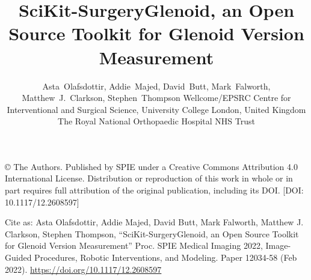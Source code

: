 \documentclass[a4paper, lmargin=1.925cm, rmargin=1.925cm,tmargin=2.54cm,bmargin=4.94cm]{spie}
\begin{document}
%
%
\pagestyle{plain}
%
%
\title{SciKit-SurgeryGlenoid, an Open Source Toolkit for Glenoid Version Measurement}
%
\author{Asta~Olafsdottir, Addie~Majed, David~Butt, Mark~Falworth,
Matthew~J.~Clarkson,
Stephen~Thompson
\skiplinehalf
{}Wellcome/EPSRC Centre for Interventional and Surgical Science, University College London, United Kingdom \\
The Royal National Orthopaedic Hospital NHS Trust\\
}

\maketitle              %

\begin{center}
	© The Authors. Published by SPIE under a Creative Commons Attribution 4.0 International License. Distribution or reproduction of this work in whole or in part requires full attribution of the original publication, including its DOI. [DOI: 10.1117/12.2608597]

	Cite as: Asta Olafsdottir, Addie Majed, David Butt, Mark Falworth, Matthew J. Clarkson, Stephen Thompson, “SciKit-SurgeryGlenoid, an Open Source Toolkit for Glenoid Version Measurement” Proc. SPIE Medical Imaging 2022, Image-Guided Procedures, Robotic Interventions, and Modeling. Paper 12034-58 (Feb 2022). \href{https://doi.org/10.1117/12.2608597}{https://doi.org/10.1117/12.2608597}
\end{center}

\begin{abstract}

\end{abstract}






%



\end{document}
